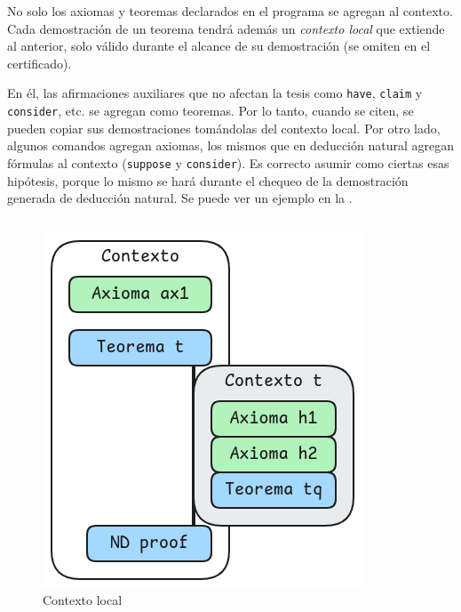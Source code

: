No solo los axiomas y teoremas declarados en el programa se agregan al
contexto. Cada demostración de un teorema tendrá además un \textit{contexto
local} que extiende al anterior, solo válido durante el alcance de su
demostración (se omiten en el certificado).

En él, las afirmaciones auxiliares que no afectan la tesis como
\lstinline{have}, \lstinline{claim} y \lstinline{consider}, etc. se agregan como
teoremas. Por lo tanto, cuando se citen, se pueden copiar sus demostraciones tomándolas del contexto local. Por otro
lado, algunos comandos agregan axiomas, los mismos que en deducción natural
agregan fórmulas al contexto (\lstinline{suppose} y \lstinline{consider}). Es
correcto asumir como ciertas esas hipótesis, porque lo mismo se hará durante el
chequeo de la demostración generada de deducción natural. Se puede ver un
ejemplo en la .

\begin{figure}[h]
    \centering
    \begin{multicols}{2}
        \begin{tabular}{c}
            
        \end{tabular}
        \vfill\null
        \columnbreak
        \includegraphics[scale=0.5]{img/ppa-local-context.png}
    \end{multicols}
    \caption{Contexto local}
    \label{ppa-cert:fig:local-context}
\end{figure}

